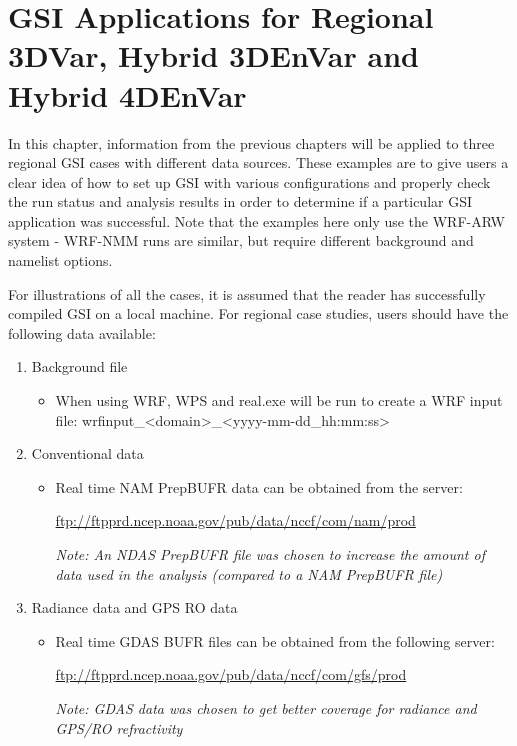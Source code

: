 \chapter{GSI Applications for Regional 3DVar, Hybrid 3DEnVar and Hybrid 4DEnVar}\label{gsi_reg}
\setlength{\parskip}{12pt}

In this chapter, information from the previous chapters will be applied to three regional GSI cases with different data sources. These examples are to give users a clear idea of how to set up GSI with various configurations and properly check the run status and analysis results in order to determine if a particular GSI application was successful. Note that the examples here only use the WRF-ARW system - WRF-NMM runs are similar, but require different background and namelist options. 

For illustrations of all the cases, it is assumed that the reader has successfully compiled GSI on a local machine. For regional case studies, users should have the following data available:

\begin{enumerate}
\item Background file
\begin{itemize}
\item When using WRF, WPS and real.exe will be run to create a WRF input file: wrfinput\_<domain>\_<yyyy-mm-dd\_hh:mm:ss>
\end{itemize}
\item Conventional data

\begin{itemize}
\item Real time NAM PrepBUFR data can be obtained from the server:

\url{ftp://ftpprd.ncep.noaa.gov/pub/data/nccf/com/nam/prod}

\textit{Note: An NDAS PrepBUFR file was chosen to increase the amount of data used in the analysis (compared to a NAM PrepBUFR file) }
\end{itemize}

\item Radiance data and GPS RO data

\begin{itemize}
\item Real time GDAS BUFR files can be obtained from the following server:

\url{ftp://ftpprd.ncep.noaa.gov/pub/data/nccf/com/gfs/prod}

\textit{Note: GDAS data was chosen to get better coverage for radiance and GPS/RO refractivity}
\end{itemize}

\end{enumerate}

